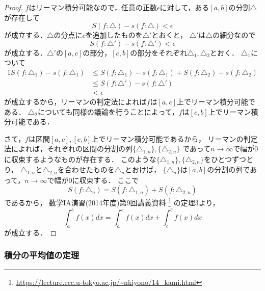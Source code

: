 \documentclass[./index]{subfiles}
\begin{document}
\begin{proof}
    $f$はリーマン積分可能なので，任意の正数$\epsilon$に対して，ある$[a, b]$の分割$\triangle$が存在して
    \begin{equation}
        S(f: \triangle) - s(f: \triangle) < \epsilon
    \end{equation}
    が成立する．$\triangle$の分点に$c$を追加したものを$\triangle'$とおくと，
    $\triangle'$は$\triangle$の細分なので
    \begin{equation}
        S(f: \triangle') - s(f: \triangle') < \epsilon
    \end{equation}
    が成立する．$\triangle'$の$[a, c]$の部分，$[c, b]$の部分をそれぞれ$\triangle_1, \triangle_2$とおく．
    $\triangle_1$について
    \begin{alignat}{1}
        S(f: \triangle_1) - s(f: \triangle_1)
            &\le S(f: \triangle_1) - s(f: \triangle_1) + S(f: \triangle_2) - s(f: \triangle_2) \\
        &\le S(f: \triangle') - s(f: \triangle') \\
        &< \epsilon
    \end{alignat}
    が成立するから，リーマンの判定法によれば$f$は$[a, c]$上でリーマン積分可能である．
    $\triangle_2$についても同様の議論を行うことによって，$f$は$[c, b]$上でリーマン積分可能である．

    さて，$f$は区間$[a, c], [c, b]$上でリーマン積分可能であるから，
    リーマンの判定法によれば，それぞれの区間の分割の列$\{\triangle_{1,n}\}, \{\triangle_{2,n}\}$
    であって$n \rightarrow \infty$で幅が0に収束するようなものが存在する．
    このような$\{\triangle_{1,n}\}, \{\triangle_{2,n}\}$をひとつずつとり，
    $\triangle_{1, n}$と$\triangle_{2, n}$を合わせたものを$\triangle_n$とおけば，
    $\{\triangle_n\}$は$[a, b]$の分割の列であって，$n \rightarrow \infty$で幅が0に収束する．
    ここで
    \begin{equation}
        S(f: \triangle_n) = S(f: \triangle_{1,n}) + S(f: \triangle_{2,n})
    \end{equation}
    であるから，
    数学IA演習(2014年度)第9回講義資料
    \footnote{\url{https://lecture.ecc.u-tokyo.ac.jp/~nkiyono/14_kami.html}}
    の定理3より，
    \begin{equation}
        \int_a^b f(x) dx = \int_a^c f(x) dx + \int_c^b f(x) dx
    \end{equation}
    が成立する．
\end{proof}

\subsubsection{積分の平均値の定理}

\begin{screen}
    \begin{proposition}
    \end{proposition}
\end{screen}
\end{document}
